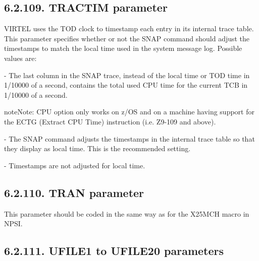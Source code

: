 \documentclass[letterpaper,10pt,english]{sphinxmanual}
\begin{document}
\subsection{6.2.109. TRACTIM parameter}
\label{\detokenize{Installation_Guide:tractim-parameter}}
\begin{sphinxVerbatim}[commandchars=\\\{\}]
 
\end{sphinxVerbatim}

VIRTEL uses the TOD clock to timestamp each entry in its internal trace table. This parameter specifies whether or not the SNAP command should adjust the timestamps to match the local time used in the system message log. Possible values are:

 - The last column in the SNAP trace, instead of the local time or TOD time in 1/10000 of a second, contains the total used CPU time for the current TCB in 1/10000 of a second.

\begin{sphinxadmonition}{note}{Note:}
CPU option only works on z/OS and on a machine having support for the ECTG (Extract CPU Time) instruction (i.e. Z9-109 and above).
\end{sphinxadmonition}

 - The SNAP command adjusts the timestamps in the internal trace table so that they display as local time. This is the recommended setting.

 - Timestamps are not adjusted for local time.


\subsection{6.2.110. TRAN parameter}
\label{\detokenize{Installation_Guide:tran-parameter}}
\begin{sphinxVerbatim}[commandchars=\\\{\}]
 
\end{sphinxVerbatim}

This parameter should be coded in the same way as for the X25MCH macro in NPSI.


\subsection{6.2.111. UFILE1 to UFILE20 parameters}
\label{\detokenize{Installation_Guide:ufile1-to-ufile20-parameters}}
\begin{sphinxVerbatim}[commandchars=\\\{\}]
 
\end{sphinxVerbatim}
\end{document}
